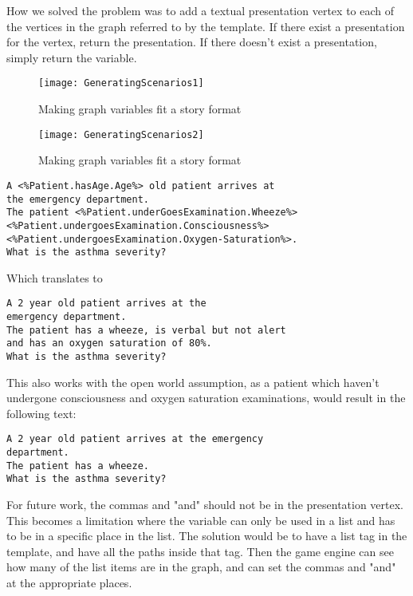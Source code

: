 How we solved the problem was to add a textual presentation vertex to each of the vertices in the graph referred to by the template. If there exist a presentation for the vertex, return the presentation. If there doesn't exist a presentation, simply return the variable.

\begin{figure}[h!]
	\caption {Making graph variables fit a story format}
	\label{fig:GeneratingScenarios1}
	\texttt{[image: GeneratingScenarios1]}
\end{figure}

\begin{figure}[h!]
	\caption {Making graph variables fit a story format}
	\label{fig:GeneratingScenarios2}
	\texttt{[image: GeneratingScenarios2]}
\end{figure}

\begin{lstlisting}[caption={Question template}, frame=single] 
A <%Patient.hasAge.Age%> old patient arrives at 
the emergency department. 
The patient <%Patient.underGoesExamination.Wheeze%> 
<%Patient.undergoesExamination.Consciousness%> 
<%Patient.undergoesExamination.Oxygen-Saturation%>. 
What is the asthma severity? 
\end{lstlisting}

Which translates to 
\begin{lstlisting}[caption={Question instantiation}, frame=single] 
A 2 year old patient arrives at the 
emergency department. 
The patient has a wheeze, is verbal but not alert 
and has an oxygen saturation of 80%. 
What is the asthma severity? 
\end{lstlisting}

This also works with the open world assumption, as a patient which haven't undergone consciousness and oxygen saturation examinations, would result in the following text:

\begin{lstlisting}[caption={Question instantiation}, frame=single] 
A 2 year old patient arrives at the emergency 
department. 
The patient has a wheeze. 
What is the asthma severity? 
\end{lstlisting}

For future work, the commas and "and" should not be in the presentation vertex. This becomes a limitation where the variable can only be used in a list and has to be in a specific place in the list. The solution would be to have a list tag in the template, and have all the paths inside that tag. Then the game engine can see how many of the list items are in the graph, and can set the commas and "and" at the appropriate places.

